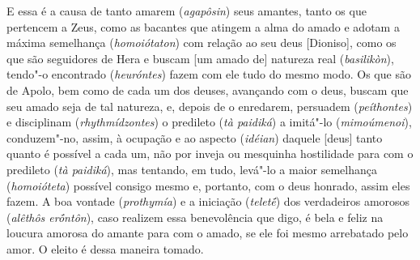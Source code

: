 E essa é a causa de tanto amarem (\emph{agapôsin}) seus amantes, tanto
os que pertencem a Zeus, como as bacantes que atingem a alma do amado e
adotam a máxima semelhança (\emph{homoiótaton}) com relação ao seu deus
[Dioniso], \bekker{[253b]} como os que são seguidores de Hera e buscam
[um amado de] natureza real (\emph{basilikòn}), tendo"-o encontrado
(\emph{heuróntes}) fazem com ele tudo do mesmo modo. \bekker{[253b]} Os que
são de Apolo, bem como de cada um dos deuses, avançando com o deus,
buscam que seu amado seja de tal natureza, e, depois de o enredarem,
persuadem (\emph{peíthontes}) e disciplinam (\emph{rhythmídzontes}) o
predileto (\emph{tà paidiká}) a imitá"-lo (\emph{mimoúmenoi}),
conduzem"-no, assim, à ocupação e ao aspecto (\emph{idéian}) daquele
[deus] tanto quanto é possível a cada um, não por inveja ou
mesquinha hostilidade para com o predileto (\emph{tà paidiká}), mas
tentando, em tudo, levá"-lo a maior semelhança (\emph{homoióteta})
possível consigo mesmo e, portanto, com o deus honrado, assim eles
fazem. \bekker{[253c]} A boa vontade (\emph{prothymía}) e a iniciação
(\emph{teletḗ}) dos verdadeiros amorosos (\emph{alêthôs erṓntôn}), caso
realizem essa benevolência que digo, é bela e feliz na loucura amorosa
do amante para com o amado, se ele foi mesmo arrebatado pelo amor. O
eleito é dessa maneira tomado.

